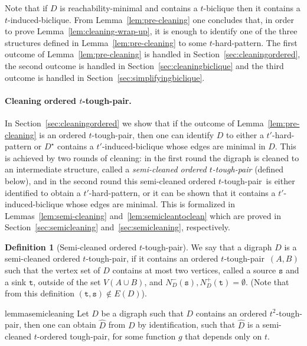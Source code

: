 \documentclass[a4paper,11pt]{article}
\theoremstyle{plain}
\newtheorem{identification rule}{Identification Rule}
\theoremstyle{definition}
\newtheorem{definition}[theorem]{Definition}
\theoremstyle{remark}
\newcommand{\toughpair}{tough-pair}
\newcommand{\sss}{\texttt{s}}
\newcommand{\ttt}{\texttt{t}}
\newcommand{\hardpattern}[1]{$#1$-hard-pattern}
\begin{document}
Note that if $D$ is reachability-minimal and contains a $t$-biclique then it contains a $t$-induced-biclique. 
From Lemma~\ref{lem:pre-cleaning} one concludes that, in order to prove Lemma~\ref{lem:cleaning-wrap-up}, it is enough to identify one of the three structures defined in Lemma~\ref{lem:pre-cleaning} to some \hardpattern{t}. The first outcome of Lemma~\ref{lem:pre-cleaning} is handled in Section~\ref{sec:cleaningordered}, the second outcome is handled in Section~\ref{sec:cleaningbiclique} and the third outcome is handled in Section~\ref{sec:simplifyingbiclique}.

\paragraph*{Cleaning ordered $t$-\toughpair.} In Section~\ref{sec:cleaningordered} we show that if the outcome of Lemma~\ref{lem:pre-cleaning} is an ordered $t$-\toughpair, then one can identify $D$ to either a \hardpattern{t'} or $D^{\star}$ contains a $t'$-induced-biclique whose edges are minimal in $D$. 
This is achieved by two rounds of cleaning: in the first round the digraph is cleaned to an intermediate structure, called a {\em semi-cleaned ordered $t$-\toughpair} (defined below), and in the second round this semi-cleaned ordered $t$-\toughpair\ is either identified to obtain a \hardpattern{t'}, or it can be shown that it contains a $t'$-induced-biclique whose edges are minimal.
This is formalized in Lemmas~\ref{lem:semi-cleaning} and~\ref{lem:semicleantoclean} which are proved in Section~\ref{sec:semicleaning} and~\ref{sec:semicleaning}, respectively.

\begin{definition}[Semi-cleaned ordered $t$-\toughpair]
We say that a digraph $D$ is a semi-cleaned ordered $t$-\toughpair, if it contains an ordered $t$-\toughpair\ $(A,B)$ such that the vertex set of $D$ contains at most two vertices, called a source $\sss$ and a sink $\ttt$, outside of the set $V(A \cup B)$, and $N^-_D(\sss), N^+_D(\ttt) =\emptyset$. (Note that from this definition $(\ttt,\sss) \not \in E(D)$).
\end{definition}

\begin{restatable}[Semi-cleaning the ordered \toughpair]{lemma}{semicleaning}\label{lem:semi-cleaning}
Let $D$ be a
digraph such that $D$ contains an ordered $t^2$-\toughpair, then one can obtain $\widehat{D}$ from $D$ by identification, such that $\widehat{D}$ is a semi-cleaned $t$-ordered \toughpair, for some function $g$ that depends only on $t$.
\end{restatable}
\end{document}
